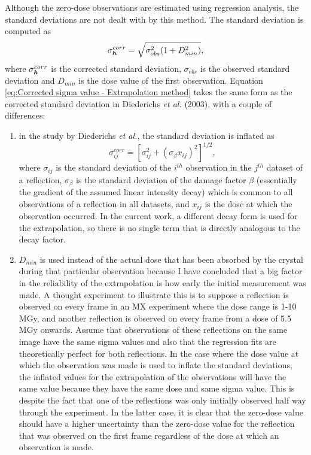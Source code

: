 Although the zero-dose observations are estimated using regression analysis, the standard deviations are not dealt with by this method.
The standard deviation is computed as
\begin{equation}
    \sigma^{corr}_{\boldsymbol{h}} = \sqrt{\sigma^2_{obs}(1 + D^2_{min})},
    \label{eq:Corrected sigma value - Extrapolation method}
\end{equation}
where $\sigma^{corr}_{\boldsymbol{h}}$ is the corrected standard deviation, $\sigma_{obs}$ is the observed standard deviation and $D_{min}$ is the dose value of the first observation.
Equation \ref{eq:Corrected sigma value - Extrapolation method} takes the same form as the corrected standard deviation in Diederichs \textit{et al.} (2003), with a couple of differences:
\begin{enumerate}
    \item in the study by Diederichs \textit{et al.}, the standard deviation is inflated as
    \begin{equation}
        \sigma^{corr}_{ij} = \left[ \sigma^2_{ij} + (\sigma_{\beta}x_{ij})^2 \right]^{1/2},
    \end{equation}
    where $\sigma_{ij}$ is the standard deviation of the $i^{th}$ observation in the $j^{th}$ dataset of a reflection, $\sigma_{\beta}$ is the standard deviation of the damage factor $\beta$ (essentially the gradient of the assumed linear intensity decay) which is common to all observations of a reflection in all datasets, and $x_{ij}$ is the dose at which the observation occurred.
    In the current work, a different decay form is used for the extrapolation, so there is no single term that is directly analogous to the decay factor.
    \item $D_{min}$ is used instead of the actual dose that has been absorbed by the crystal during that particular observation because I have concluded that a big factor in the reliability of the extrapolation is how early the initial measurement was made.
    A thought experiment to illustrate this is to suppose a reflection is observed on every frame in an MX experiment where the dose range is 1-10 MGy, and another reflection is observed on every frame from a dose of 5.5 MGy onwards.
    Assume that observations of these reflections on the same image have the same sigma values and also that the regression fits are theoretically perfect for both reflections.
    In the case where the dose value at which the observation was made is used to inflate the standard deviations, the inflated values for the extrapolation of the observations will have the same value because they have the same dose and same sigma value.
    This is despite the fact that one of the reflections was only initially observed half way through the experiment.
    In the latter case, it is clear that the zero-dose value should have a higher uncertainty than the zero-dose value for the reflection that was observed on the first frame regardless of the dose at which an observation is made.
\end{enumerate}

